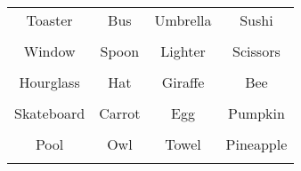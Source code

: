 \documentclass[12pt,a4paper]{article}
\begin{document}
\thispagestyle{empty}
\begin{table}[]
\centering
\Huge
\begin{tabular}{cccc}
 Toaster& Bus& Umbrella& Sushi\\  & & & \\
 Window& Spoon& Lighter& Scissors\\  & & & \\
 Hourglass& Hat& Giraffe& Bee\\  & & & \\
 Skateboard& Carrot& Egg& Pumpkin\\  & & & \\
 Pool& Owl& Towel& Pineapple\\  & & & \\
\end{tabular}
\end{table}
\end{document}
